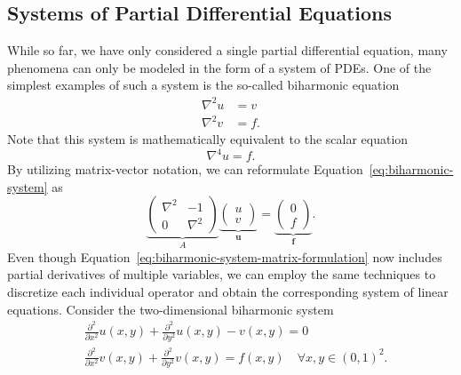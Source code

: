 \subsection{Systems of Partial Differential Equations}
\label{subsec:systems-of-pdes}
While so far, we have only considered a single partial differential equation, many phenomena can only be modeled in the form of a system of PDEs.
One of the simplest examples of such a system is the so-called biharmonic equation
\begin{equation}
	\begin{split}
		\nabla^2 u & = v  \\
		\nabla^2 v & = f.
	\end{split}
\label{eq:biharmonic-system}
\end{equation}
Note that this system is mathematically equivalent to the scalar equation 
\begin{equation}
	\nabla^4 u = f.
\end{equation}
By utilizing matrix-vector notation, we can reformulate Equation~\eqref{eq:biharmonic-system} as
\begin{equation}
	\underbrace{
	\begin{pmatrix}
		\nabla^2 & -1 \\
		0 & \nabla^2
	\end{pmatrix}}_{A}
\underbrace{ 
	\begin{pmatrix}
		u \\ v
	\end{pmatrix}
}_{\bm{u}}
=
\underbrace{
\begin{pmatrix}
	0 \\ f
\end{pmatrix}
}_{\bm{f}}.
\label{eq:biharmonic-system-matrix-formulation}
\end{equation}
Even though Equation~\eqref{eq:biharmonic-system-matrix-formulation} now includes partial derivatives of multiple variables, we can employ the same techniques to discretize each individual operator and obtain the corresponding system of linear equations. 
Consider the two-dimensional biharmonic system
\begin{equation}
	\begin{split}
		& \frac{\partial^2}{\partial x^2} u(x,y) + \frac{\partial^2}{\partial y^2} u(x,y) - v(x, y) = 0 \\
		& \frac{\partial^2}{\partial x^2} v(x,y) + \frac{\partial^2}{\partial y^2} v(x,y) = f(x, y) \quad \forall x, y \in (0, 1)^2.
	\end{split}
	\label{eq:2D-biharmonic-system}
\end{equation}
